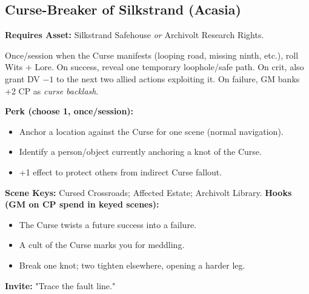 \subsection{Curse-Breaker of Silkstrand (Acasia)}
\textbf{Requires Asset:} Silkstrand Safehouse \emph{or} Archivolt Research Rights.
\begin{tcolorbox}[enhanced,sharp corners,boxrule=.6pt,title={Talent — Follow the Unspooled Thread (7 XP)}]
Once/session when the Curse manifests (looping road, missing ninth, etc.), roll Wits + Lore. On success, reveal one temporary loophole/safe path. On crit, also grant DV $-1$ to the next two allied actions exploiting it. On failure, GM banks +2 CP as \emph{curse backlash}.
\end{tcolorbox}
\textbf{Perk (choose 1, once/session):}
\begin{itemize}
  \item Anchor a location against the Curse for one scene (normal navigation).
  \item Identify a person/object currently anchoring a knot of the Curse.
  \item +1 effect to protect others from indirect Curse fallout.
\end{itemize}
\textbf{Scene Keys:} Cursed Crossroads; Affected Estate; Archivolt Library.
\textbf{Hooks (GM on CP spend in keyed scenes):}
\begin{itemize}
  \item The Curse twists a future success into a failure.
  \item A cult of the Curse marks you for meddling.
  \item Break one knot; two tighten elsewhere, opening a harder leg.
\end{itemize}
\textbf{Invite:} "Trace the fault line."

